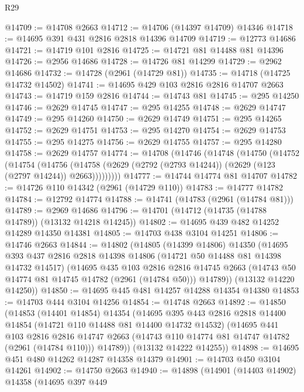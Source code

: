 \begin{lexlean}{R29}
\begin{coremodule}
@14709 := @14708 @2663
@14712 := @14706 (@14397 @14709) @14346
@14718 := @14695 @391 @431 @2816 @2818 @14396 @14709
@14719 := @12773 @14686
@14721 := @14719 @101 @2816
@14725 := @14721 @81 @14488 @81 @14396
@14726 := @2956 @14686
@14728 := @14726 @81 @14299
@14729 := @2962 @14686
@14732 := @14728 (@2961 (@14729 @81))
@14735 := @14718 (@14725 @14732 @14502)
@14741 := @14695 @429 @103 @2816 @2816 @14707 @2663
@14743 := @14719 @159 @2816
@14744 := @14743 @81
@14745 := @295 @14250
@14746 := @2629 @14745
@14747 := @295 @14255
@14748 := @2629 @14747
@14749 := @295 @14260
@14750 := @2629 @14749
@14751 := @295 @14265
@14752 := @2629 @14751
@14753 := @295 @14270
@14754 := @2629 @14753
@14755 := @295 @14275
@14756 := @2629 @14755
@14757 := @295 @14280
@14758 := @2629 @14757
@14774 := @14708
    (@14746
      (@14748
        (@14750
          (@14752
            (@14754
              (@14756
                (@14758 (@2629 (@2792 (@2793 @14244)) (@2629 (@123 (@2797 @14244)) @2663)))))))))
@14777 := @14744 @14774 @81 @14707
@14782 := @14726 @110 @14342 (@2961 (@14729 @110))
@14783 := @14777 @14782
@14784 := @12792 @14774
@14788 := @14741 (@14783 (@2961 (@14784 @81)))
@14789 := @2969 @14686
@14796 := @14701 (@14712 (@14735 (@14788 @14789)) (@13132 @14218 @14245))
@14802 := @14695 @439 @482 @14252 @14289 @14350 @14381
@14805 := @14703 @438 @3104 @14251
@14806 := @14746 @2663
@14844 := @14802
    (@14805
      (@14399 @14806)
      @14350
      (@14695
        @393
        @437
        @2816
        @2818
        @14398
        @14806
        (@14721 @50 @14488 @81 @14398 @14732 @14517)
        (@14695
          @435
          @103
          @2816
          @2816
          @14745
          @2663
          (@14743 @50 @14774 @81 @14745 @14782 (@2961 (@14784 @50)))
          @14789))
      (@13132 @14220 @14250))
@14850 := @14695 @445 @481 @14257 @14288 @14354 @14380
@14853 := @14703 @444 @3104 @14256
@14854 := @14748 @2663
@14892 := @14850
    (@14853
      (@14401 @14854)
      @14354
      (@14695
        @395
        @443
        @2816
        @2818
        @14400
        @14854
        (@14721 @110 @14488 @81 @14400 @14732 @14532)
        (@14695
          @441
          @103
          @2816
          @2816
          @14747
          @2663
          (@14743 @110 @14774 @81 @14747 @14782 (@2961 (@14784 @110)))
          @14789))
      (@13132 @14222 @14255))
@14898 := @14695 @451 @480 @14262 @14287 @14358 @14379
@14901 := @14703 @450 @3104 @14261
@14902 := @14750 @2663
@14940 := @14898
    (@14901
      (@14403 @14902)
      @14358
      (@14695
        @397
        @449

\end{coremodule}
\end{lexlean}
